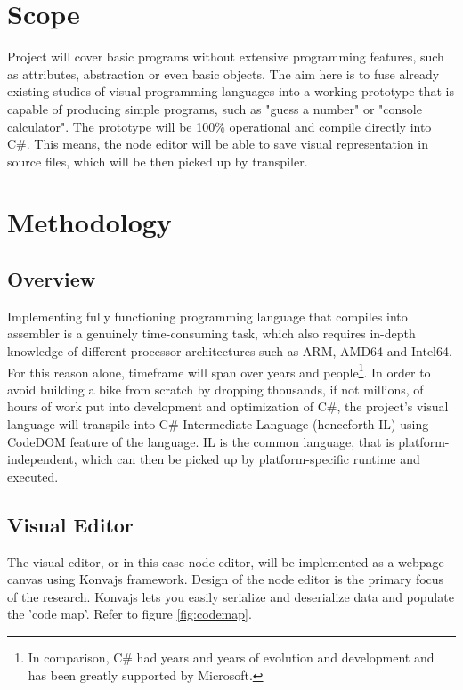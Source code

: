 \documentclass{article}
\begin{document}
\section{Scope}
Project will cover basic programs without extensive programming features, such as attributes, abstraction or even basic objects. The aim here is to fuse already existing studies of visual programming languages into a working prototype that is capable of producing simple programs, such as "guess a number" or "console calculator".
The prototype will be 100\% operational and compile directly into C\#. This means, the node editor will be able to save visual representation in source files, which will be then picked up by transpiler.

\section{Methodology}
\subsection*{Overview}
Implementing fully functioning programming language that compiles into assembler is a genuinely time-consuming task, which also requires in-depth knowledge of different processor architectures such as ARM, AMD64 and Intel64. For this reason alone, timeframe will span over years and people\footnote{In comparison, C\# had years and years of evolution and development and has been greatly supported by Microsoft.}. In order to avoid building a bike from scratch by dropping thousands, if not millions, of hours of work put into development and optimization of C\#, the project's visual language will transpile into C\# Intermediate Language (henceforth IL) using CodeDOM feature of the language. IL is the common language, that is platform-independent, which can then be picked up by platform-specific runtime and executed.
\subsection*{Visual Editor}
The visual editor, or in this case node editor, will be implemented as a webpage canvas using Konvajs framework. Design of the node editor is the primary focus of the research.
Konvajs lets you easily serialize and deserialize data and populate the 'code map'. Refer to figure \ref{fig:codemap}.
\end{document}

